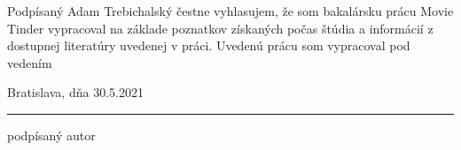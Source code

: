 Podpísaný Adam Trebichalský čestne vyhlasujem, že som bakalársku prácu Movie Tinder vypracoval na základe poznatkov získaných počas štúdia a informácií z dostupnej literatúry uvedenej v práci.\newline
Uvedenú prácu som vypracoval pod vedením \printVeduciZaverecnejPrace

\vspace{3cm}

Bratislava, dňa 30.5.2021

\vspace{1cm}

\hfill 
\parbox[t]{.5\linewidth}{\rule[-3pt]{\linewidth}{.4pt}\par\smallskip  
\hspace{2.65cm}podpísaný autor}